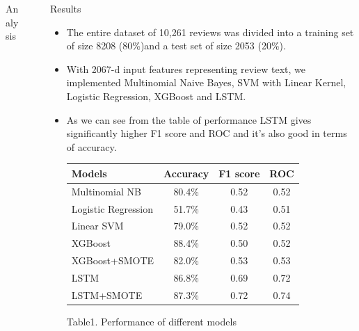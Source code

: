 \documentclass[final]{beamer}
\newlength{\sepwid}
\newlength{\onecolwid}
\begin{document}
\begin{frame}[t]
\begin{columns}[t]
\begin{column}{\onecolwid}
\begin{block}{Analysis}
\end{block}
\end{column} %

\begin{column}{\sepwid}\end{column} %

\begin{column}{\onecolwid} %

\begin{block}{Results}

\begin{itemize}
\item The entire dataset of 10,261 reviews was divided into a training set of size 8208 (80\%)and a test set of size 2053 (20\%).

\item With 2067-d input features representing review text, we implemented Multinomial Naive Bayes, SVM with Linear Kernel, Logistic Regression, XGBoost and LSTM.

\item As we can see from the table of performance LSTM gives significantly higher F1 score and ROC and it's also good in terms of accuracy.

\bigskip
\begin{center}

\begin{tabular}{ l|c|c|c} 

  Models & Accuracy & F1 score & ROC  \\
 \hline
 Multinomial NB & 80.4\% & 0.52 & 0.52  \\ 
 Logistic Regression & 51.7\% & 0.43 & 0.51  \\ 
 Linear SVM & 79.0\% & 0.52 & 0.52 \\ 
 XGBoost & 88.4\% & 0.50 & 0.52 \\ 
 XGBoost+SMOTE & 82.0\% & 0.53 & 0.53 \\ 
 LSTM & 86.8\% & 0.69 & 0.72 \\
 LSTM+SMOTE & 87.3\% & 0.72 & 0.74 \\
 \hline

\end{tabular}

\bigskip
\end{center}
\begin{center}
 \caption{Table1. Performance of different models}
\end{center}


\end{itemize}
\end{block}
\end{column}
\end{columns}
\end{frame}
\end{document}
